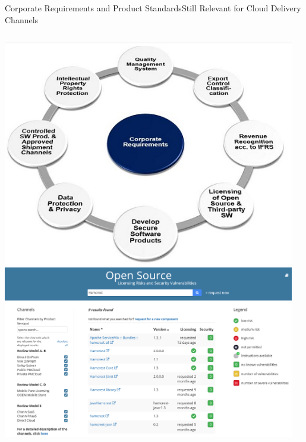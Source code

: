 \begin{frame}{Corporate Requirements and Product Standards}{Still Relevant for Cloud Delivery Channels}


\scriptsize%
 \begin{columns}
    \begin{column}{0.35\textwidth}
	\includegraphics[width=\textwidth]{../ContinuousDelivery/images/CorporateRequirementsCircle}
	\vspace{5mm}
	\\\includegraphics[width=\textwidth]{../ContinuousDelivery/images/OpenSourceApi}
    \end{column}
    \begin{column}{0.6\textwidth}

\end{column}
\end{columns}
\end{frame}
